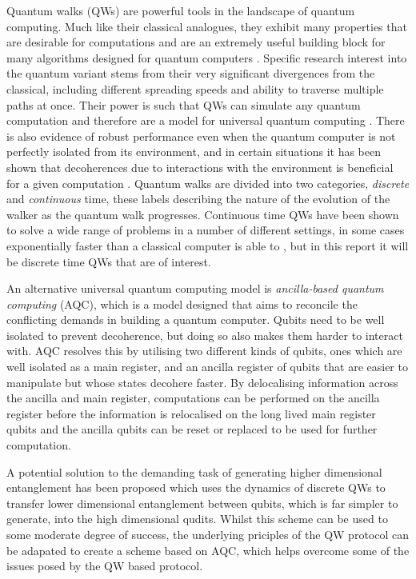Quantum walks (QWs) are powerful tools in the landscape of quantum computing. 
Much like their classical analogues, they exhibit many properties that are desirable for computations and are an extremely useful building block for many algorithms designed for quantum computers \cite{shenvi2003}. 
Specific research interest into the quantum variant stems from their very significant divergences from the classical, including different spreading speeds and ability to traverse multiple paths at once. 
Their power is such that QWs can simulate any quantum computation and therefore are a model for universal quantum computing \cite{Childs_2009}.
There is also evidence of robust performance even when the quantum computer is not perfectly isolated from its environment, and in certain situations it has been shown that decoherences due to interactions with the environment is beneficial for a given computation \cite{KENDON_2007}.
Quantum walks are divided into two categories, \emph{discrete} and \emph{continuous} time, these labels describing the nature of the evolution of the walker as the quantum walk progresses.
Continuous time QWs have been shown to solve a wide range of problems in a number of different settings, in some cases exponentially faster than a classical computer is able to \cite{Childs_2003}, but in this report it will be discrete time QWs that are of interest. 

An alternative universal quantum computing model is \emph{ancilla-based quantum computing} (AQC), which is a model designed that aims to reconcile the conflicting demands in building a quantum computer.
Qubits need to be well isolated to prevent decoherence, but doing so also makes them harder to interact with.
AQC resolves this by utilising two different kinds of qubits, ones which are well isolated as a main register, and an ancilla register of qubits that are easier to manipulate but whose states decohere faster.
By delocalising information across the ancilla and main register, computations can be performed on the ancilla register before the information is relocalised on the long lived main register qubits and the ancilla qubits can be reset or replaced to be used for further computation.

A potential solution to the demanding task of generating higher dimensional entanglement has been proposed \cite{giordani2020} which uses the dynamics of discrete QWs to transfer lower dimensional entanglement between qubits, which is far simpler to generate, into the high dimensional qudits.
Whilst this scheme can be used to some moderate degree of success, the underlying priciples of the QW protocol can be adapated to create a scheme based on AQC, which helps overcome some of the issues posed by the QW based protocol.

